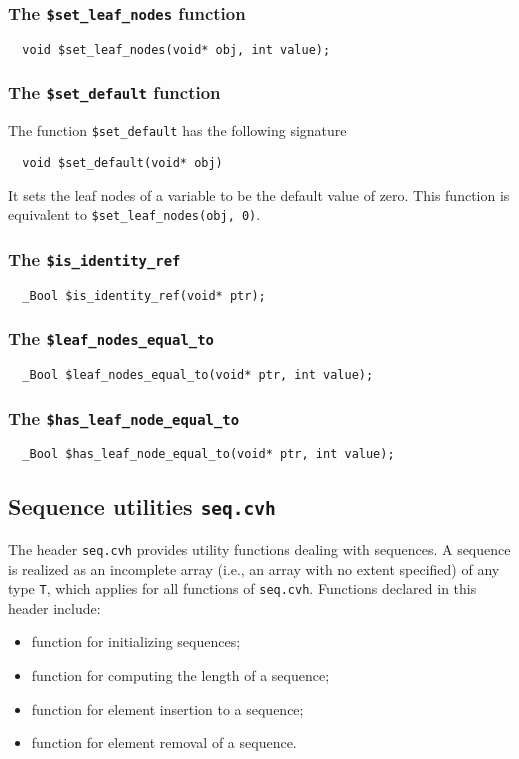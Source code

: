 \subsubsection{The \texttt{\$set\_leaf\_nodes} function}
\begin{verbatim}
  void $set_leaf_nodes(void* obj, int value);
\end{verbatim}

\subsubsection{The \texttt{\$set\_default} function}
The function \texttt{\$set\_default} has the following signature
\begin{verbatim}
  void $set_default(void* obj)
\end{verbatim}
It sets the leaf nodes of a variable to be the default value of zero. This function
is equivalent to \texttt{\$set\_leaf\_nodes(obj, 0)}.

\subsubsection{The \texttt{\$is\_identity\_ref}}
\begin{verbatim}
  _Bool $is_identity_ref(void* ptr);
\end{verbatim}

\subsubsection{The \texttt{\$leaf\_nodes\_equal\_to}}
\begin{verbatim}
  _Bool $leaf_nodes_equal_to(void* ptr, int value);
\end{verbatim}

\subsubsection{The \texttt{\$has\_leaf\_node\_equal\_to}}
\begin{verbatim}
  _Bool $has_leaf_node_equal_to(void* ptr, int value);
\end{verbatim}



\subsection{Sequence utilities \texttt{seq.cvh}}
\label{subsec:seqLibrary}
The header \texttt{seq.cvh} provides utility functions dealing with sequences. A sequence is realized as an incomplete array (i.e., an array with no extent specified) of any type \texttt{T}, which applies for all functions of \texttt{seq.cvh}. Functions declared in this header include:
\begin{itemize}
\item function \cseqinit{} for initializing sequences;
\item function \cseqlen{} for computing the length of a sequence;
\item function \cseqinsert{} for element insertion to a sequence;
\item function \cseqrm{} for element removal of a sequence.
\end{itemize}


